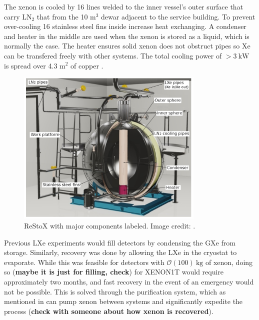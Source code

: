 The xenon is cooled by 16 lines welded to the inner vessel's outer surface that carry LN$_2$ that from the 10 m$^3$ dewar adjacent to the
service building.  To prevent over-cooling 16 stainless steel fins inside increase heat
exchanging.  A condenser and heater in the middle are used when the xenon is stored as a liquid, which is normally the case.  The heater
ensures solid xenon does not obstruct pipes so Xe can be transfered freely with other systems.  The total cooling power of
$> 3\ \mathrm{kW}$ is spread over 4.3 m$^2$ of copper .

\begin{figure}
\centering
\includegraphics[width=0.8\textwidth]{ReStoX}
\caption{ReStoX with major components labeled.  Image credit: .}
\label{fig:xenon1t_restox_pic}
\end{figure}

Previous LXe experiments would fill detectors by condensing the GXe from storage.  Similarly, recovery was done by allowing the LXe
in the cryostat to evaporate.  While this was feasible for detectors with $\mathcal{O}(100)\ \mathrm{kg}$ of xenon, doing so
(\textbf{maybe it is just for filling, check}) for XENON1T would require approximately two months, and fast recovery in the event of an
emergency would not be possible.  This is solved through the purification system, which as mentioned in  can
pump xenon between systems and significantly expedite the process (\textbf{check with someone about how xenon is recovered}).



